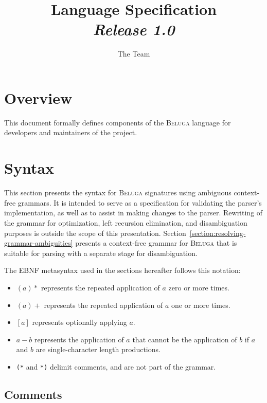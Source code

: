 \documentclass[11pt]{article}
\title{%
\Beluga Language Specification%
\\\Large\textit{Release 1.0}
}
\author{The \Beluga Team}
\newcommand{\Beluga}{\textsc{Beluga}\xspace}
\begin{document}
\maketitle

\tableofcontents

\section*{Overview}

This document formally defines components of the \Beluga language for developers and maintainers of the project.

\section{Syntax}\label{section:syntax}

This section presents the syntax for \Beluga signatures using ambiguous context-free grammars.
It is intended to serve as a specification for validating the parser's implementation, as well as to assist in making changes to the parser.
Rewriting of the grammar for optimization, left recursion elimination, and disambiguation purposes is outside the scope of this presentation.
Section~\ref{section:resolving-grammar-ambiguities} presents a context-free grammar for \Beluga that is suitable for parsing with a separate stage for disambiguation.

The EBNF metasyntax used in the sections hereafter follows this notation:

\begin{itemize}
\item $ (a)* $ represents the repeated application of $ a $ zero or more times.
\item $ (a)+ $ represents the repeated application of $ a $ one or more times.
\item $ [a] $ represents optionally applying $ a $.
\item $ a - b $ represents the application of $ a $ that cannot be the application of $ b $ if $ a $ and $ b $ are single-character length productions.
\item \texttt{(*} and \texttt{*)} delimit comments, and are not part of the grammar.
\end{itemize}

\subsection{Comments}
\end{document}
